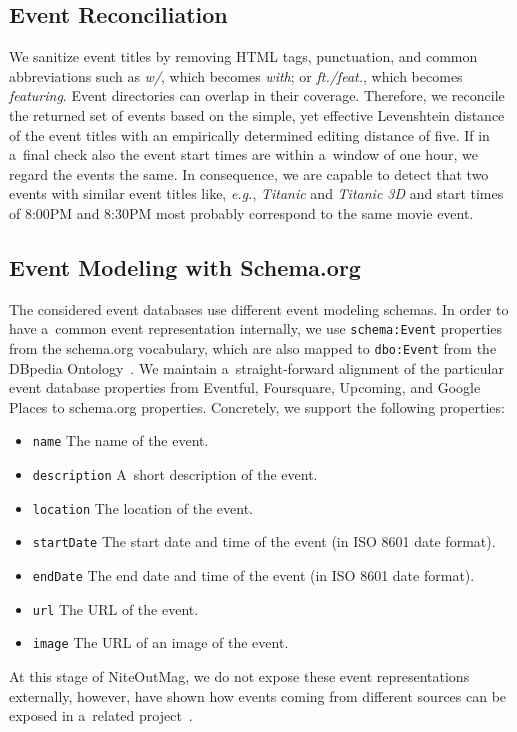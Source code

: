 \documentclass[runningheads,a4paper]{llncs}
\begin{document}
{\subsection{Event Reconciliation}
We sanitize event titles by removing HTML tags, punctuation, and
common abbreviations such as \emph{w/}, which becomes \emph{with}; or \emph{ft./feat.}, which becomes \emph{featuring}.
Event directories can overlap in their coverage.
Therefore, we reconcile the returned set of events based on the simple, yet effective Levenshtein distance of the event titles with an empirically determined editing distance of five.
If in a~final check also the event start times are within a~window of one hour,
we regard the events the same.
In consequence, we are capable to detect that two events with similar event titles like, \emph{e.g.}, \emph{Titanic} and \emph{Titanic 3D} and start times of 8:00PM and 8:30PM most probably correspond to the same movie event.

\subsection{Event Modeling with Schema.org}
The considered event databases use different event modeling schemas.
In order to have a~common event representation internally, 
we use \texttt{schema:Event} properties~\cite{schemaorgevent} from the schema.org vocabulary,
which are also mapped to \texttt{dbo:Event} from the DBpedia Ontology~\cite{dbpedia2schemaorg}.
We maintain a~straight-forward alignment of the particular event database properties
from Eventful, Foursquare, Upcoming, and Google Places to schema.org properties.
Concretely, we support the following properties:
\begin{itemize}
  \item \texttt{name} The name of the event.
  \item \texttt{description} A~short description of the event.
  \item \texttt{location} The location of the event.
  \item \texttt{startDate} The start date and time of the event (in ISO 8601 date format).
  \item \texttt{endDate} The end date and time of the event (in ISO 8601 date format).
  \item \texttt{url} The URL of the event.
  \item \texttt{image} The URL of an image of the event.
\end{itemize}
At this stage of NiteOutMag, we do not expose these event representations externally,
however, have shown how events coming from different sources
can be exposed in a~related project~\cite{Liu2011}.

}
\end{document}
